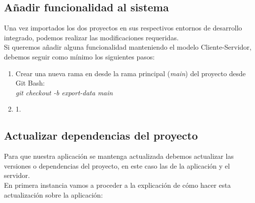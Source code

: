 \subsection{Añadir funcionalidad al sistema}

Una vez importados los dos proyectos en sus respectivos entornos de desarrollo integrado, podemos realizar las modificaciones requeridas.\\
Si queremos añadir alguna funcionalidad manteniendo el modelo Cliente-Servidor, debemos seguir como mínimo los siguientes pasos:

\begin{enumerate}
\item
	Crear una nueva rama en desde la rama principal (\textit{main}) del proyecto desde Git Bash:\\
	\textit{git checkout -b export-data main}
\item
	1.
\end{enumerate}

\subsection{Actualizar dependencias del proyecto}

Para que nuestra aplicación se mantenga actualizada debemos actualizar las versiones o dependencias del proyecto, en este caso las de la aplicación y el servidor.\\

En primera instancia vamos a proceder a la explicación de cómo hacer esta actualización sobre la aplicación:

